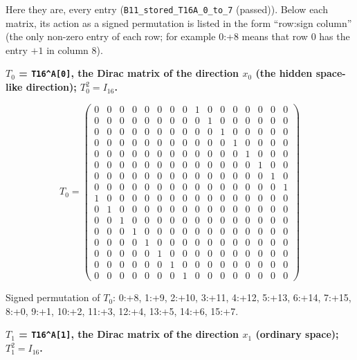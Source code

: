 \documentclass[
  10pt,
]{article}
\begin{document}
Here they are, every entry (\texttt{B11\_stored\_T16A\_0\_to\_7}
(passed)). Below each matrix, its action as a signed permutation is
listed in the form ``row:sign column'' (the only non-zero entry of each
row; for example 0:+8 means that row 0 has the entry \(+1\) in column
8).

\textbf{\(T_0\) = \texttt{T16\^{}A{[}0{]}}, the Dirac matrix of the
direction \(x_0\) (the hidden space-like direction);
\(T_0^2 = I_{16}\).}

\[
T_0 = \scriptstyle \begin{pmatrix} 0 & 0 & 0 & 0 & 0 & 0 & 0 & 0 & 1 & 0 & 0 & 0 & 0 & 0 & 0 & 0 \\ 0 & 0 & 0 & 0 & 0 & 0 & 0 & 0 & 0 & 1 & 0 & 0 & 0 & 0 & 0 & 0 \\ 0 & 0 & 0 & 0 & 0 & 0 & 0 & 0 & 0 & 0 & 1 & 0 & 0 & 0 & 0 & 0 \\ 0 & 0 & 0 & 0 & 0 & 0 & 0 & 0 & 0 & 0 & 0 & 1 & 0 & 0 & 0 & 0 \\ 0 & 0 & 0 & 0 & 0 & 0 & 0 & 0 & 0 & 0 & 0 & 0 & 1 & 0 & 0 & 0 \\ 0 & 0 & 0 & 0 & 0 & 0 & 0 & 0 & 0 & 0 & 0 & 0 & 0 & 1 & 0 & 0 \\ 0 & 0 & 0 & 0 & 0 & 0 & 0 & 0 & 0 & 0 & 0 & 0 & 0 & 0 & 1 & 0 \\ 0 & 0 & 0 & 0 & 0 & 0 & 0 & 0 & 0 & 0 & 0 & 0 & 0 & 0 & 0 & 1 \\ 1 & 0 & 0 & 0 & 0 & 0 & 0 & 0 & 0 & 0 & 0 & 0 & 0 & 0 & 0 & 0 \\ 0 & 1 & 0 & 0 & 0 & 0 & 0 & 0 & 0 & 0 & 0 & 0 & 0 & 0 & 0 & 0 \\ 0 & 0 & 1 & 0 & 0 & 0 & 0 & 0 & 0 & 0 & 0 & 0 & 0 & 0 & 0 & 0 \\ 0 & 0 & 0 & 1 & 0 & 0 & 0 & 0 & 0 & 0 & 0 & 0 & 0 & 0 & 0 & 0 \\ 0 & 0 & 0 & 0 & 1 & 0 & 0 & 0 & 0 & 0 & 0 & 0 & 0 & 0 & 0 & 0 \\ 0 & 0 & 0 & 0 & 0 & 1 & 0 & 0 & 0 & 0 & 0 & 0 & 0 & 0 & 0 & 0 \\ 0 & 0 & 0 & 0 & 0 & 0 & 1 & 0 & 0 & 0 & 0 & 0 & 0 & 0 & 0 & 0 \\ 0 & 0 & 0 & 0 & 0 & 0 & 0 & 1 & 0 & 0 & 0 & 0 & 0 & 0 & 0 & 0 \end{pmatrix}
\]

Signed permutation of \(T_0\): 0:+8, 1:+9, 2:+10, 3:+11, 4:+12, 5:+13,
6:+14, 7:+15, 8:+0, 9:+1, 10:+2, 11:+3, 12:+4, 13:+5, 14:+6, 15:+7.

\textbf{\(T_1\) = \texttt{T16\^{}A{[}1{]}}, the Dirac matrix of the
direction \(x_1\) (ordinary space); \(T_1^2 = I_{16}\).}
\end{document}
